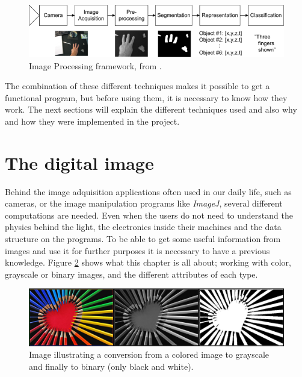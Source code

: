 \begin{figure}[htbp]
\centering
\includegraphics[width=1.00\textwidth]{Pictures/Theory/imageProcessing_steps.png}
\caption{Image Processing framework, from \citep{ip_book}.}
\label{fig:ip_framework}
\end{figure}


The combination of these different techniques makes it possible to get a functional program, but before using them, it is necessary to know how they work. The next sections will explain the different techniques used and also why and how they were implemented in the project. 

\section{The digital image}
Behind the image adquisition applications often used in our daily life, such as cameras, or the image manipulation programs like \textit{ImageJ}, several different computations are needed. Even when the users do not need to understand the physics behind the light, the electronics inside their machines and the data structure on the programs. To be able to get some useful information from images and use it for further purposes it is necessary to have a previous knowledge. Figure \ref{fig:ip_ColoredToGrayscaleToBinary} shows what this chapter is all about; working with color, grayscale or binary images, and the different attributes of each type.

\begin{figure}[htbp]
\centering
\includegraphics[width=1.00\textwidth]{Pictures/Theory/ColoredToGrayscaleToBinary.jpg}
\caption{Image illustrating a conversion from a colored image to grayscale and finally to binary (only black and white).}
\label{fig:ip_ColoredToGrayscaleToBinary}
\end{figure}

